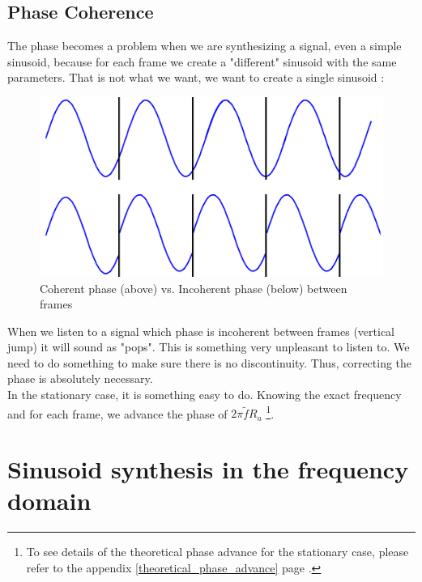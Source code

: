 \documentclass[]{article}
\begin{document}
\newpage

\subsection{Phase Coherence}\label{phase-coherence}
The phase becomes a problem when we are synthesizing a signal, even a simple sinusoid, because for each frame we create a "different" sinusoid with the same parameters. That is not what we want, we want to create a single sinusoid : 
\begin{figure} [H]
	\centering
	\includegraphics[scale = 0.2]{coherentphase.png}
	\caption {Coherent phase (above) vs. Incoherent phase (below) between frames}
\end{figure}
When we listen to a signal which phase is incoherent between frames (vertical jump) it will sound as "pops".  This is something very unpleasant to listen to. We need to do something to make sure there is no discontinuity. Thus, correcting the phase is absolutely necessary. \\
In the stationary case, it is something easy to do. Knowing the exact frequency and for each frame, we advance the phase of $2\pi \tilde{f} R_a$  \footnote{To see details of the theoretical phase advance for the stationary case, please refer to the appendix \ref{theoretical_phase_advance} page \pageref{theoretical_phase_advance}.}.
\section{Sinusoid synthesis in the frequency domain}
\end{document}
